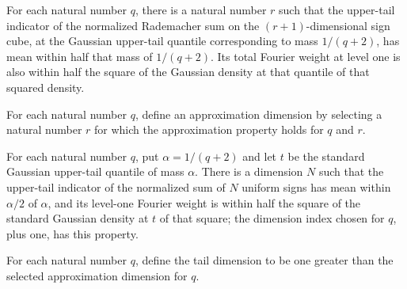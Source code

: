 \begin{theorem}
\label{FABL.exists_fknOptimalityApproximation}
\leanok
{}
For each natural number $q$, there is a natural number $r$ such that the upper-tail
indicator of the normalized Rademacher sum on the $(r+1)$-dimensional sign cube, at the
Gaussian upper-tail quantile corresponding to mass $1/(q+2)$, has mean within half that
mass of $1/(q+2)$. Its total Fourier weight at level one is also within half the square
of the Gaussian density at that quantile of that squared density.
\end{theorem}

\begin{definition}
\label{FABL.fknOptimalityDimensionIndex}
\leanok
{}
For each natural number $q$, define an approximation dimension by selecting a natural
number $r$ for which the approximation property holds for $q$ and $r$.
\end{definition}

\begin{theorem}
\label{FABL.fknOptimalityDimensionIndex_spec}
\leanok
{}
For each natural number $q$, put $\alpha=1/(q+2)$ and let $t$ be the standard Gaussian
upper-tail quantile of mass $\alpha$. There is a dimension $N$ such that the upper-tail
indicator of the normalized sum of $N$ uniform signs has mean within $\alpha/2$ of
$\alpha$, and its level-one Fourier weight is within half the square of the standard
Gaussian density at $t$ of that square; the dimension index chosen for $q$, plus one,
has this property.
\end{theorem}

\begin{definition}
\label{FABL.fknOptimalityTailDimension}
\leanok
{}
For each natural number $q$, define the tail dimension to be one greater than the
selected approximation dimension for $q$.
\end{definition}

